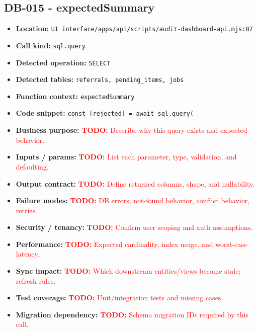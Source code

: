 \documentclass[11pt]{article}
\newcommand{\todoitem}[1]{\textcolor{red}{\textbf{TODO:} #1}}
\begin{document}
\subsection{DB-015 - expectedSummary}
\begin{itemize}[leftmargin=1.5em]
\item \textbf{Location:} \texttt{UI interface/apps/api/scripts/audit-dashboard-api.mjs:87}
\item \textbf{Call kind:} \texttt{sql.query}
\item \textbf{Detected operation:} \texttt{SELECT}
\item \textbf{Detected tables:} \texttt{referrals, pending\_items, jobs}
\item \textbf{Function context:} \texttt{expectedSummary}
\item \textbf{Code snippet:} \texttt{const [rejected] = await sql.query(}
\item \textbf{Business purpose:} \todoitem{Describe why this query exists and expected behavior.}
\item \textbf{Inputs / params:} \todoitem{List each parameter, type, validation, and defaulting.}
\item \textbf{Output contract:} \todoitem{Define returned columns, shape, and nullability.}
\item \textbf{Failure modes:} \todoitem{DB errors, not-found behavior, conflict behavior, retries.}
\item \textbf{Security / tenancy:} \todoitem{Confirm user scoping and auth assumptions.}
\item \textbf{Performance:} \todoitem{Expected cardinality, index usage, and worst-case latency.}
\item \textbf{Sync impact:} \todoitem{Which downstream entities/views become stale; refresh rules.}
\item \textbf{Test coverage:} \todoitem{Unit/integration tests and missing cases.}
\item \textbf{Migration dependency:} \todoitem{Schema migration IDs required by this call.}
\end{itemize}
\end{document}
